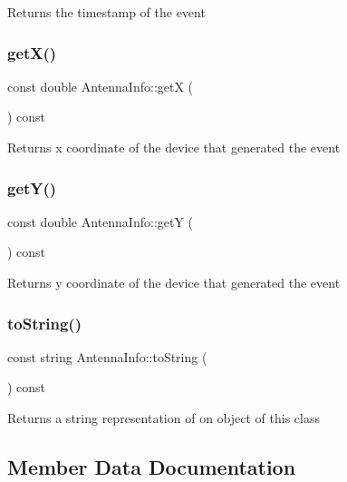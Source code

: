 \begin{DoxyReturn}{Returns}
the timestamp of the event 
\end{DoxyReturn}
\mbox{\label{class_antenna_info_a0d88898b505d24eb4523826a3764418f}} 
\subsubsection{getX()}
{\footnotesize\ttfamily const double Antenna\+Info\+::getX (\begin{DoxyParamCaption}{ }\end{DoxyParamCaption}) const}

\begin{DoxyReturn}{Returns}
x coordinate of the device that generated the event 
\end{DoxyReturn}
\mbox{\label{class_antenna_info_a2ded26354fed2a3ca77fd22b705de2fa}} 
\subsubsection{getY()}
{\footnotesize\ttfamily const double Antenna\+Info\+::getY (\begin{DoxyParamCaption}{ }\end{DoxyParamCaption}) const}

\begin{DoxyReturn}{Returns}
y coordinate of the device that generated the event 
\end{DoxyReturn}
\mbox{\label{class_antenna_info_ae1ba7432ca7aef9a4f79a422ee195a58}} 
\subsubsection{toString()}
{\footnotesize\ttfamily const string Antenna\+Info\+::to\+String (\begin{DoxyParamCaption}{ }\end{DoxyParamCaption}) const}

\begin{DoxyReturn}{Returns}
a string representation of on object of this class 
\end{DoxyReturn}


\subsection{Member Data Documentation}
\mbox{\label{class_antenna_info_a828117bd06f7d0ddd5493d4258b9ca3a}} 
